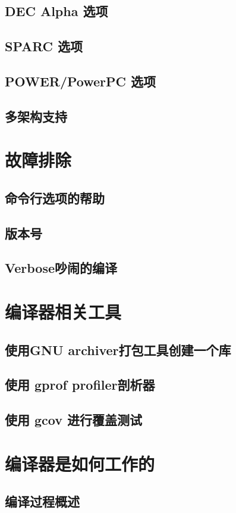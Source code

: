 \documentclass[lang=cn,12pt,newtx,scheme=chinese]{elegantbook}
\begin{document}
\section{DEC Alpha 选项}
\section{SPARC 选项}
\section{POWER/PowerPC 选项}
\section{多架构支持}

\chapter{故障排除}
\section{命令行选项的帮助}
\section{版本号}
\section{Verbose吵闹的编译}

\chapter{编译器相关工具}
\section{使用GNU archiver打包工具创建一个库}
\section{使用 gprof profiler剖析器}
\section{使用 gcov 进行覆盖测试}

\chapter{编译器是如何工作的}
\section{编译过程概述}
\end{document}
